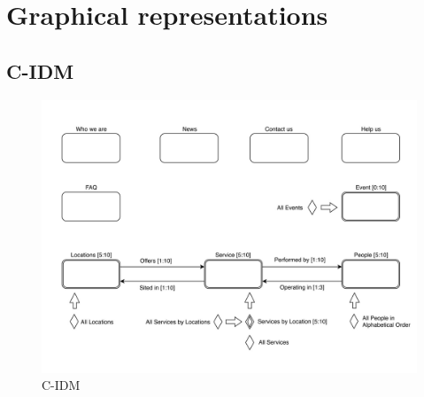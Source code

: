 %
%
\chapter{Graphical representations}
%
%
%
\section{C-IDM}
%
\begin{figure}[h]
\includegraphics[width=1.3\textwidth, center]{MainMatter/images/C-IDM.jpg}
\caption{C-IDM}
\label{fig:figure1}
\end{figure}
%
